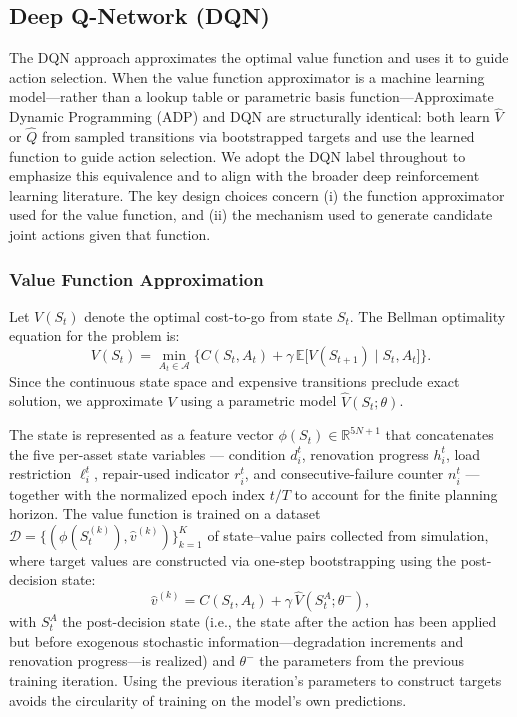 \documentclass[3p, twocolumn]{elsarticle}
\begin{document}
\subsection{Deep Q-Network (DQN)}
\label{subsec:DQN}

The DQN approach approximates the optimal value function and uses it to guide action selection. When the value function approximator is a machine learning model---rather than a lookup table or parametric basis function---Approximate Dynamic Programming (ADP) and DQN are structurally identical: both learn $\hat{V}$ or $\hat{Q}$ from sampled transitions via bootstrapped targets and use the learned function to guide action selection. We adopt the DQN label throughout to emphasize this equivalence and to align with the broader deep reinforcement learning literature. The key design choices concern (i) the function approximator used for the value function, and (ii) the mechanism used to generate candidate joint actions given that function.

\subsubsection{Value Function Approximation}

Let $V(S_t)$ denote the optimal cost-to-go from state $S_t$. The Bellman optimality equation for the problem is:
\begin{equation}
    V(S_t) = \min_{A_t \in \mathcal{A}} \Big\{ C(S_t, A_t) + \gamma \, \mathbb{E}\big[V(S_{t+1}) \mid S_t, A_t \big] \Big\}.
    \label{eq:bellman}
\end{equation}
Since the continuous state space and expensive transitions preclude exact solution, we approximate $V$ using a parametric model $\hat{V}(S_t; \theta)$.

The state is represented as a feature vector $\phi(S_t) \in \mathbb{R}^{5N+1}$ that concatenates the five per-asset state variables --- condition $d_i^t$, renovation progress $h_i^t$, load restriction $\ell_i^t$, repair-used indicator $r_i^t$, and consecutive-failure counter $n_i^t$ --- together with the normalized epoch index $t/T$ to account for the finite planning horizon. The value function is trained on a dataset $\mathcal{D} = \{(\phi(S_t^{(k)}), \hat{v}^{(k)})\}_{k=1}^{K}$ of state--value pairs collected from simulation, where target values are constructed via one-step bootstrapping using the post-decision state:
\begin{equation}
    \hat{v}^{(k)} = C(S_t, A_t) + \gamma \, \hat{V}(S_t^{A}; \theta^-),
    \label{eq:target}
\end{equation}
with $S_t^{A}$ the post-decision state (i.e., the state after the action has been applied but before exogenous stochastic information---degradation increments and renovation progress---is realized) and $\theta^-$ the parameters from the previous training iteration. Using the previous iteration's parameters to construct targets avoids the circularity of training on the model's own predictions.
\end{document}
